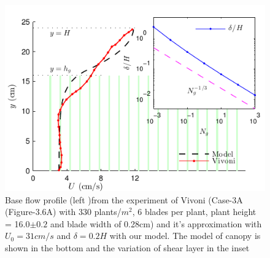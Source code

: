 \documentclass[aps,prl,twocolumn,showpacs,superscriptaddress,groupedaddress,10pt]{revtex4-1}  %
\begin{document}
\begin{figure}[htb]
  \includegraphics[scale=1]{Grass_Base_Vivoni_shear}
\caption{Base flow profile (left )from the experiment of Vivoni\cite{Vivoni98} (Case-3A (Figure-3.6A) with 330 plants/$m^2$, 6 blades per plant, 
plant height = 16.0$\pm0.2$ and blade width of 0.28cm)
 and it's approximation with $U_0=31cm/s$ and $\delta = 0.2H$ with our model. The model of canopy is shown in the bottom and the variation of shear layer in the inset }
\label{fig:basicflow}
\end{figure}
\end{document}
